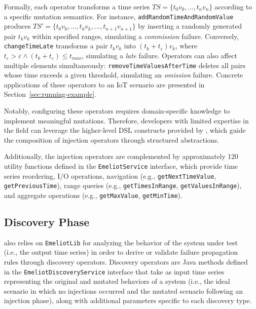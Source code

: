 Formally, each operator transforms a time series $TS = \{t_0 v_0, \ldots, t_n v_n\}$ according to a specific mutation semantics. For instance, \texttt{addRandomTimeAndRandomValue} produces $TS' = \{t_0 v_0, \ldots, t_k v_k, \ldots, t_{n+1} v_{n+1}\}$ by inserting a randomly generated pair $t_k v_k$ within specified ranges, simulating a \textit{commission} failure. Conversely, \texttt{changeTimeLate} transforms a pair $t_k v_k$ into $(t_k + t_\varepsilon) v_k$, where $t_\varepsilon > \varepsilon \land (t_k + t_\varepsilon) \leq t_{max}$, simulating a \textit{late} failure. Operators can also affect multiple elements simultaneously: \texttt{removeTimeValuesAfterTime} deletes all pairs whose time exceeds a given threshold, simulating an \textit{omission} failure. Concrete applications of these operators to an IoT scenario are presented in Section~\ref{sec:running-example}.

Notably, configuring these operators requires domain-specific knowledge to implement meaningful mutations. Therefore, developers with limited expertise in the field can leverage the higher-level DSL constructs provided by \tool, which guide the composition of injection operators through structured abstractions.

Additionally, the injection operators are complemented by approximately 120 utility functions defined in the \texttt{EmeliotService} interface, which provide time series reordering, I/O operations, navigation (e.g., \texttt{getNextTimeValue}, \texttt{getPreviousTime}), range queries (e.g., \texttt{getTimesInRange}, \texttt{getValuesInRange}), and aggregate operations (e.g., \texttt{getMaxValue}, \texttt{getMinTime}).

\subsection{Discovery Phase}
\label{sec:discovery}

\tool also relies on \texttt{EmeliotLib} for analyzing the behavior of the system under test (i.e., the output time series) in order to derive or validate failure propagation rules through discovery operators. Discovery operators are Java methods defined in the \texttt{EmeliotDiscoveryService} interface that take as input time series representing the original and mutated behaviors of a system (i.e., the ideal scenario in which no injections occurred and the mutated scenario following an injection phase), along with additional parameters specific to each discovery type.

